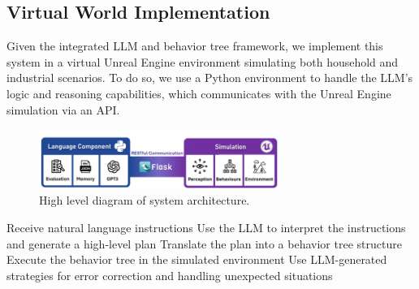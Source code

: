 \documentclass[pdflatex,sn-mathphys-num]{sn-jnl}%
\theoremstyle{thmstyleone}
\theoremstyle{thmstyletwo}%
\theoremstyle{thmstylethree}%
\begin{document}
\subsection{Virtual World Implementation}
Given the integrated LLM and behavior tree framework, we implement this system in a virtual Unreal Engine environment simulating both household and industrial scenarios. To do so, we use a Python environment to handle the LLM's logic and reasoning capabilities, which communicates with the Unreal Engine simulation via an API.
\begin{figure}[H]
\centering
\includegraphics[width=0.7\textwidth]{figures/Picture2.png}
\caption{High level diagram of system architecture.}\label{fig3}
\end{figure}
Receive natural language instructions
Use the LLM to interpret the instructions and generate a high-level plan
Translate the plan into a behavior tree structure
Execute the behavior tree in the simulated environment
Use LLM-generated strategies for error correction and handling unexpected situations
\end{document}
